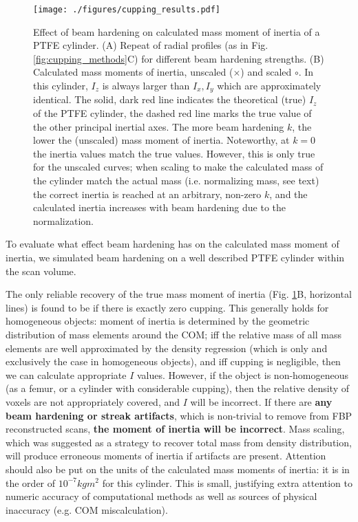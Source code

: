 \begin{figure}[htbp]
\centering
\texttt{[image: ./figures/cupping\_results.pdf]}
\caption{\label{fig:cupping_results}Effect of beam hardening on calculated mass moment of inertia of a PTFE cylinder. (A) Repeat of radial profiles (as in Fig. \ref{fig:cupping_methods}C) for different beam hardening strengths. (B) Calculated mass moments of inertia, unscaled (\(\times\)) and scaled \(\circ\). In this cylinder, \(I_z\) is always larger than \(I_x, I_y\) which are approximately identical. The solid, dark red line indicates the theoretical (true) \(I_z\) of the PTFE cylinder, the dashed red line marks the true value of the other principal inertial axes. The more beam hardening \(k\), the lower the (unscaled) mass moment of inertia. Noteworthy, at \(k=0\) the inertia values match the true values. However, this is only true for the unscaled curves; when scaling to make the calculated mass of the cylinder match the actual mass (i.e. normalizing mass, see text) the correct inertia is reached at an arbitrary, non-zero \(k\), and the calculated inertia increases with beam hardening due to the normalization.}
\end{figure}

To evaluate what effect beam hardening has on the calculated mass moment of inertia, we simulated beam hardening on a well described PTFE cylinder within the scan volume.

The only reliable recovery of the true mass moment of inertia (Fig. \ref{fig:cupping_results}B, horizontal lines) is found to be if there is exactly zero cupping.
This generally holds for homogeneous objects: moment of inertia is determined by the geometric distribution of mass elements around the COM; iff the relative mass of all mass elements are well approximated by the density regression (which is only and exclusively the case in homogeneous objects), and iff cupping is negligible, then we can calculate appropriate \(I\) values.
However, if the object is non-homogeneous (as a femur, or a cylinder with considerable cupping), then the relative density of voxels are not appropriately covered, and \(I\) will be incorrect.
If there are \textbf{any beam hardening or streak artifacts}, which is non-trivial to remove from FBP reconstructed scans, \textbf{the moment of inertia will be incorrect}.
Mass scaling, which was suggested as a strategy to recover total mass from density distribution, will produce erroneous moments of inertia if artifacts are present.
Attention should also be put on the units of the calculated mass moments of inertia: it is in the order of \(10^{-7} kg m^2\) for this cylinder.
This is small, justifying extra attention to numeric accuracy of computational methods as well as sources of physical inaccuracy (e.g. COM miscalculation).

